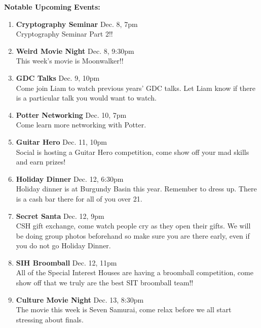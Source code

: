 \documentclass[9pt]{extarticle} %
\begin{document}
\begin{minipage}[t]{.32\linewidth}
\begin{mdframed}[style=sidebar,frametitle={}]
\textbf{Notable Upcoming Events:}
\begin{enumerate}[leftmargin=0.2cm]
\item \textbf{Cryptography Seminar} Dec. 8, 7pm\\
	Cryptography Seminar Part 2!!
\\
\item \textbf{Weird Movie Night} Dec. 8, 9:30pm \\
	This week's movie is Moonwalker!!
\\
\item \textbf{GDC Talks} Dec. 9, 10pm \\
	Come join Liam to watch previous years' GDC talks. Let Liam know
	if there is a particular talk you would want to watch.
\\
\item \textbf{Potter Networking} Dec. 10, 7pm \\
	Come learn more networking with Potter.
\\
\item \textbf{Guitar Hero} Dec. 11, 10pm \\
	Social is hosting a Guitar Hero competition, come show
	off your mad skills and earn prizes!
\\
\item \textbf{Holiday Dinner} Dec. 12, 6:30pm \\
	Holiday dinner is at Burgundy Basin this year. Remember
	to dress up. There is a cash bar there for all of you
	over 21.
\\
\item \textbf{Secret Santa} Dec. 12, 9pm \\
	CSH gift exchange, come watch people cry as they open their gifts.
	We will be doing group photos beforehand so make sure you are there
	early, even if you do not go Holiday Dinner.
\\
\item \textbf{SIH Broomball} Dec. 12, 11pm \\
	All of the Special Interest Houses are having a broomball competition,
	come show off that we truly are the best SIT broomball team!!
\\
\item \textbf{Culture Movie Night} Dec. 13, 8:30pm \\
	The movie this week is Seven Samurai, come relax before we all
	start stressing about finals. \\ 
\end{enumerate}




\end{mdframed}
\end{minipage}\hfill %
\end{document}
